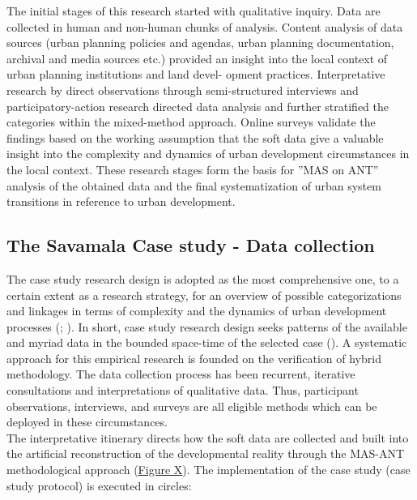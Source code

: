 \documentclass[11pt]{report}
\begin{document}
The initial stages of this research started with qualitative inquiry. Data are collected in human and non-human chunks of analysis. Content analysis of data sources (urban planning policies and agendas, urban planning documentation, archival and media sources etc.) provided an insight into the local context of urban planning institutions and land devel- opment practices. Interpretative research by direct observations through semi-structured interviews and participatory-action research directed data analysis and further stratified the categories within the mixed-method approach. Online surveys validate the findings based on the working assumption that the soft data give a valuable insight into the complexity and dynamics of urban development circumstances in the local context. These research stages form the basis for ”MAS on ANT” analysis of the obtained data and the final systematization of urban system transitions in reference to urban development.

\subsection{The Savamala Case study - Data collection} \label{sec:predis}

The case study research design is adopted as the most comprehensive one, to a certain extent as a research strategy, for an overview of possible categorizations and linkages in terms of complexity and the dynamics of urban development processes  (\href{Meredith}{\citealt{meredith_theory_1993}}; \href{Harrison}{\citealt{partington_case_2002}}). In short, case study research design seeks patterns of the available and myriad data in the bounded space-time of the selected case (\href{Denzin}{\citealt{denzin_research_2009}}). A systematic approach for this empirical research is founded on the verification of hybrid methodology. The data collection process has been recurrent, iterative consultations and interpretations of qualitative data. 
Thus, participant observations, interviews, and surveys are all eligible methods which can be deployed in these circumstances.
\\
The interpretative itinerary directs how the soft data are collected and built into the artificial reconstruction of the developmental reality through the MAS-ANT methodological approach (\href{Figure xxx}{Figure X}). The implementation of the case study (case study protocol) is executed in circles:
\end{document}

